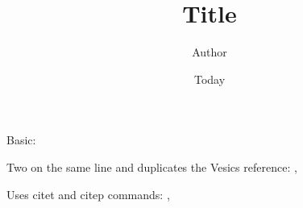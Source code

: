 \documentclass[]{article}
\begin{document}
\title{Title}
\author{Author}
\date{Today}
\maketitle

Basic: \cite{Vesic:1975}

Two on the same line and duplicates the Vesics reference: \cite{Vesic:1975}, \cite{Chatzigogos:2008uv}

Uses citet and citep commands: \citet{Raychowdhury:2009hw}, \citep{Safak:1992ub}
\end{document}
